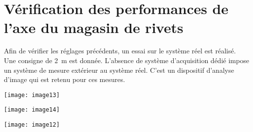 \section*{Vérification des performances de l'axe du magasin de rivets}
\ifprof
\else

Afin de vérifier les réglages précédents, un essai sur le système réel est réalisé. Une consigne de \SI{2}{m} est donnée. L'absence de système d'acquisition dédié impose un système de mesure extérieur au système réel. C'est un dispositif d'analyse d'image qui est retenu pour ces mesures.
\fi

\ifprof
\begin{corrige}
\end{corrige}
\else
\fi

 
\ifprof
\else
\begin{marginfigure}
\texttt{[image: image13]}
\label{fig:image11}
\end{marginfigure} 

\begin{marginfigure}
\texttt{[image: image14]}
\label{fig:image11}
\end{marginfigure} 


 \begin{center}
\texttt{[image: image12]}
\end{center} 
\fi




